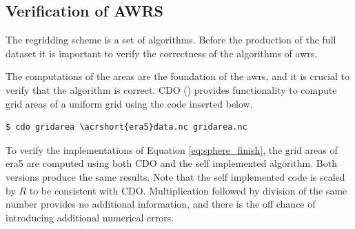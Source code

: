 \subsection{Verification of AWRS}
The regridding scheme is a set of algorithms. Before the production of the full dataset it is important to verify the correctness of the algorithms of \acrshort{awrs}.

The computations of the areas are the foundation of the \acrshort{awrs}, and it is crucial to verify that the algorithm is correct. CDO (\cite{cdo}) provides functionality to compute grid areas of a uniform grid using the code inserted below.
\begin{verbatim}
$ cdo gridarea \acrshort{era5}data.nc gridarea.nc     
\end{verbatim}
To verify the implementations of Equation \eqref{eq:sphere_finish}, the grid areas of \acrshort{era5} are computed using both CDO and the self implemented algorithm. Both versions produce the same results.
Note that the self implemented code is scaled by $R$ to be consistent with CDO. Multiplication followed by division of the same number provides no additional information, and there is the off chance of introducing additional numerical errors. 

